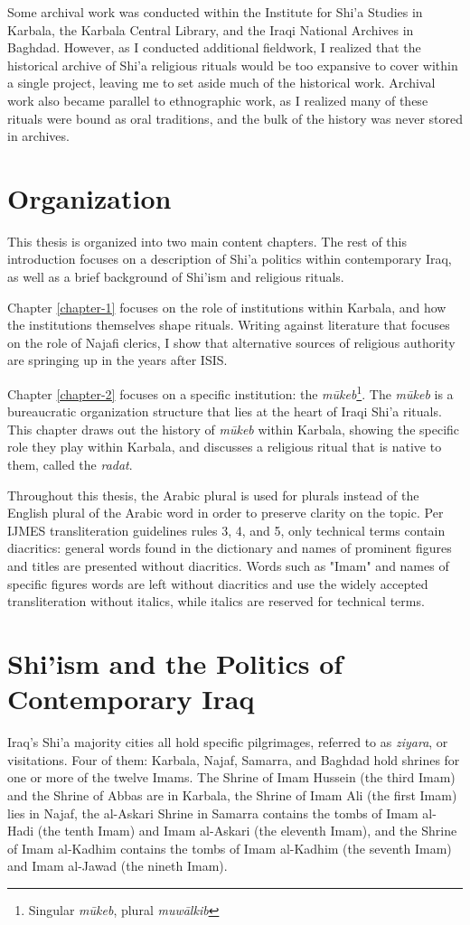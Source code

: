 Some archival work was conducted within the Institute for Shi'a Studies in Karbala, the Karbala Central Library, and the Iraqi National Archives in Baghdad. However, as I conducted additional fieldwork, I realized that the historical archive of Shi'a religious rituals would be too expansive to cover within a single project, leaving me to set aside much of the historical work. Archival work also became parallel to ethnographic work, as I realized many of these rituals were bound as oral traditions, and the bulk of the history was never stored in archives. 

\section{Organization}

This thesis is organized into two main content chapters. The rest of this introduction focuses on a description of Shi'a politics within contemporary Iraq, as well as a brief background of Shi'ism and religious rituals.

Chapter \ref{chapter-1} focuses on the role of institutions within Karbala, and how the institutions themselves shape rituals. Writing against literature that focuses on the role of Najafi clerics, I show that alternative sources of religious authority are springing up in the years after ISIS.

Chapter \ref{chapter-2} focuses on a specific institution: the \emph{mūkeb}\footnote{Singular \emph{mūkeb}, plural \emph{muwālkib}}. The \emph{mūkeb} is a bureaucratic organization structure that lies at the heart of Iraqi Shi'a rituals. This chapter draws out the history of \emph{mūkeb} within Karbala, showing the specific role they play within Karbala, and discusses a religious ritual that is native to them, called the \emph{radat}.

Throughout this thesis, the Arabic plural is used for plurals instead of the English plural of the Arabic word in order to preserve clarity on the topic. Per IJMES transliteration guidelines rules 3, 4, and 5, only technical terms contain diacritics: general words found in the dictionary and names of prominent figures and titles are presented without diacritics. Words such as "Imam" and names of specific figures words are left without diacritics and use the widely accepted transliteration without italics, while italics are reserved for technical terms.

\section{Shi'ism and the Politics of Contemporary Iraq}
Iraq's Shi'a majority cities all hold specific pilgrimages, referred to as \emph{ziyara}, or visitations. Four of them: Karbala, Najaf, Samarra, and Baghdad hold shrines for one or more of the twelve Imams. The Shrine of Imam Hussein (the third Imam) and the Shrine of Abbas are in Karbala, the Shrine of Imam Ali (the first Imam) lies in Najaf, the al-Askari Shrine in Samarra contains the tombs of Imam al-Hadi (the tenth Imam) and Imam al-Askari (the eleventh Imam), and the Shrine of Imam al-Kadhim contains the tombs of Imam al-Kadhim (the seventh Imam) and Imam al-Jawad (the nineth Imam). 

